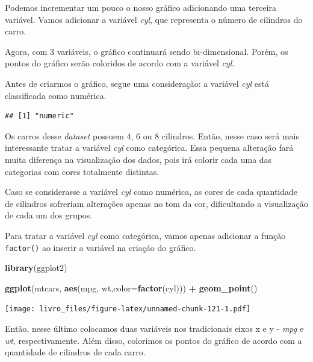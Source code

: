 \documentclass[
]{book}
\newenvironment{Shaded}{\begin{snugshade}}{\end{snugshade}}
\newcommand{\DataTypeTok}[1]{\textcolor[rgb]{0.13,0.29,0.53}{#1}}
\newcommand{\KeywordTok}[1]{\textcolor[rgb]{0.13,0.29,0.53}{\textbf{#1}}}
\newcommand{\NormalTok}[1]{#1}
\newcommand{\OperatorTok}[1]{\textcolor[rgb]{0.81,0.36,0.00}{\textbf{#1}}}
\newcommand{\StringTok}[1]{\textcolor[rgb]{0.31,0.60,0.02}{#1}}
\begin{document}
Podemos incrementar um pouco o nosso gráfico adicionando uma terceira
variável. Vamos adicionar a variável \emph{cyl}, que representa o número
de cilindros do carro.

Agora, com 3 variáveis, o gráfico continuará sendo bi-dimensional.
Porém, os pontos do gráfico serão coloridos de acordo com a variável
\emph{cyl}.

Antes de criarmos o gráfico, segue uma consideração: a variável
\emph{cyl} está classificada como numérica.

\begin{Shaded}
\end{Shaded}

\begin{verbatim}
## [1] "numeric"
\end{verbatim}

Os carros desse \emph{dataset} possuem 4, 6 ou 8 cilindros. Então, nesse
caso será mais interessante tratar a variável \emph{cyl} como
categórica. Essa pequena alteração fará muita diferença na visualização
dos dados, pois irá colorir cada uma das categorias com cores totalmente
distintas.

Caso se considerasse a variável \emph{cyl} como numérica, as cores de
cada quantidade de cilindros sofreriam alterações apenas no tom da cor,
dificultando a visualização de cada um dos grupos.

Para tratar a variável \emph{cyl} como categórica, vamos apenas
adicionar a função \texttt{factor()} ao inserir a variável na criação do
gráfico.

\begin{Shaded}
\begin{Highlighting}[]
\KeywordTok{library}\NormalTok{(ggplot2)}

\KeywordTok{ggplot}\NormalTok{(mtcars, }\KeywordTok{aes}\NormalTok{(mpg, wt,}\DataTypeTok{color=}\KeywordTok{factor}\NormalTok{(cyl))) }\OperatorTok{+}
\StringTok{  }\KeywordTok{geom_point}\NormalTok{()}
\end{Highlighting}
\end{Shaded}

\texttt{[image: livro\_files/figure-latex/unnamed-chunk-121-1.pdf]}

Então, nesse último colocamos duas variáveis nos tradicionais eixos x e
y - \emph{mpg} e \emph{wt}, respectivamente. Além disso, colorimos os
pontos do gráfico de acordo com a quantidade de cilindros de cada carro.
\end{document}
